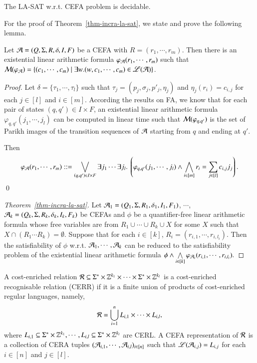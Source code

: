\begin{theorem}\label{thm-incra-la-sat}
	The LA-SAT w.r.t. CEFA problem is decidable.
\end{theorem}

For the proof of Theorem~\ref{thm-incra-la-sat}, we state and prove the following lemma. 

\begin{lemma}\label{lem-incra-la}
	Let $\mathcal{A}=(Q, \Sigma, R, \delta, I, F)$ be a CEFA with $R= (r_1, \cdots,  r_m)$. Then there is an existential linear arithmetic formula $\varphi_{\mathcal{A}}(r_1, \cdots, r_m)$ such that $\mathcal{M}(\varphi_{\mathcal{A}})= \{(c_1, \cdots, c_m) \mid \exists w.  (w, c_1, \cdots, c_m) \in \mathscr{L}(\mathcal{A})\}$.
\end{lemma}

\begin{proof}
	Let $\delta = \{\tau_1, \cdots, \tau_l\}$ such that $\tau_j = (p_j, \sigma_j, p'_j, \eta_j)$ and $\eta_j(r_i) =  c_{i,j}$ for each $j \in [l]$ and $i \in [m]$.
	According the results on FA, we know that for each pair of states $(q, q') \in I \times F$,  an existential linear arithmetic formula $\varphi_{q,q'}(j_1, \cdots, j_l)$ can be computed in linear time such that $\mathcal{M}(\varphi_{q,q'})$ is the set of Parikh images of the transition sequences of $\mathcal{A}$ starting from $q$ and ending at $q'$. 
	
	Then 
	\[\varphi_\NFA(r_1, \cdots, r_m) ::= \bigvee \limits_{(q,q') \in I \times F} \exists j_1 \cdots \exists j_l.\ \left(\varphi_{q,q'}(j_1, \cdots, j_l) \wedge \bigwedge \limits_{i \in [m]} r_i = \sum \limits_{j \in [l]} c_{i,j} j_j \right).\]
	\qed
\end{proof}

\begin{proof}[Theorem~\ref{thm-incra-la-sat}]
	Let $\mathcal{A}_1=(Q_1, \Sigma, R_1, \delta_1, I_1, F_1)$, $\cdots$, $\mathcal{A}_k=(Q_k, \Sigma, R_k, \delta_k, I_k, F_k)$ be CEFAs and $\phi$ be a quantifier-free linear arithmetic formula whose free variables are from  $R_1 \cup \cdots \cup R_k \cup X$ for some $X$ such that $X \cap (R_1 \cdots R_k) = \emptyset$.
	Suppose that for each $i \in [k]$, $R_i = (r_{i, 1}, \cdots, r_{i, l_i})$. Then the satisfiability of $\phi$ w.r.t. $\mathcal{A}_1,\cdots, \mathcal{A}_k$ can be reduced to the satisfiability problem of the  existential linear arithmetic formula
	$
	\phi \wedge \bigwedge \limits_{i \in [k]} \varphi_{\mathcal{A}_i}(r_{i,1}, \cdots, r_{i, l_i}).
	$
\end{proof}

\begin{definition}
	A cost-enriched relation $\mathcal{R} \subseteq \Sigma^* \times \mathbb{Z}^{k_1} \times \cdots  \times \Sigma^* \times \mathbb{Z}^{k_l}$ is a cost-enriched recognisable relation (CERR)  if it is a finite union of products of cost-enriched regular languages, namely, 
	\[\mathcal{R} = \bigcup \limits_{i=1}^n L_{i,1 } \times \cdots \times L_{i, l},\]
	where $L_{i,1} \subseteq \Sigma^* \times \mathbb{Z}^{k_1}, \cdots, L_{i, l} \subseteq \Sigma^* \times \mathbb{Z}^{k_l}$ are CERL. 
	A CEFA representation of $\mathcal{R}$ is a collection of CERA tuples $(\mathcal{A}_{i,1}, \cdots, \mathcal{A}_{i,l})_{i \in [n]}$ such that $\mathscr{L}(\mathcal{A}_{i,j}) = L_{i,j}$ for each $i \in [n]$ and $j \in [l]$.
\end{definition}
